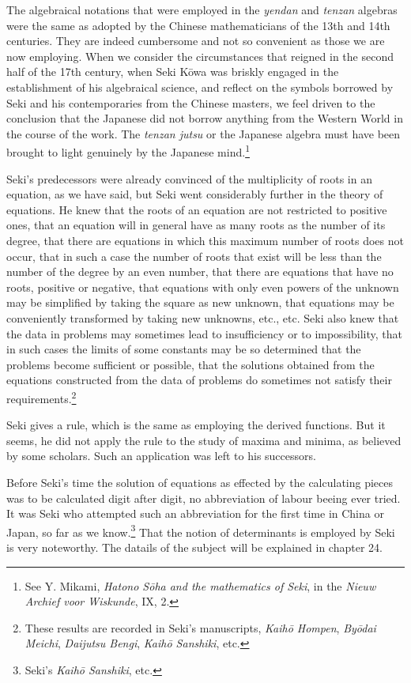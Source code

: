 \documentclass[11pt]{article}
\newcommand{\scanpage}[2]{\clearpage\setcounter{footnote}{0}\noindent{\footnotesize\color{gray}PDF page #1 · #2}\par\medskip}
\newcommand{\scanfooter}{}
\begin{document}
The algebraical notations that were employed in the \emph{yendan} and \emph{tenzan} algebras were the same as adopted by the Chinese mathematicians of the 13th and 14th centuries. They are indeed cumbersome and not so convenient as those we are now employing. When we consider the circumstances that reigned in the second half of the 17th century, when Seki Kōwa was briskly engaged in the establishment of his algebraical science, and reflect on the symbols borrowed by Seki and his contemporaries from the Chinese masters, we feel driven to the conclusion that the Japanese did not borrow anything from the Western World in the course of the work. The \emph{tenzan jutsu} or the Japanese algebra must have been brought to light genuinely by the Japanese mind.\footnote{See Y. Mikami, \emph{Hatono Sōha and the mathematics of Seki}, in the \emph{Nieuw Archief voor Wiskunde}, IX, 2.}

Seki's predecessors were already convinced of the multiplicity of roots in an equation, as we have said, but Seki went considerably further in the theory of equations. He knew that the roots of an equation are not restricted to positive ones, that an equation will in general have as many roots as the number of its degree, that there are equations in which this maximum number of roots does not occur, that in such a case the number of roots that exist will be less than the number of the degree by an even number, that there are equations that have no roots, positive or negative, that equations with only even powers of the unknown may be simplified by taking the square as new unknown, that equations may be conveniently transformed by taking new unknowns, etc., etc. Seki also knew that the data in problems may sometimes lead to insufficiency or to impossibility, that in such cases the limits of some constants may be so determined that the problems become sufficient or possible, that the solutions obtained from the equations constructed from the data of problems do sometimes not satisfy their requirements.\footnote{These results are recorded in Seki's manuscripts, \emph{Kaihō Hompen}, \emph{Byōdai Meichi}, \emph{Daijutsu Bengi}, \emph{Kaihō Sanshiki}, etc.}
\scanfooter

\scanpage{0177}{Chapter 22, printed page 163}
Seki gives a rule, which is the same as employing the derived functions. But it seems, he did not apply the rule to the study of maxima and minima, as believed by some scholars. Such an application was left to his successors.

Before Seki's time the solution of equations as effected by the calculating pieces was to be calculated digit after digit, no abbreviation of labour beeing ever tried. It was Seki who attempted such an abbreviation for the first time in China or Japan, so far as we know.\footnote{Seki's \emph{Kaihō Sanshiki}, etc.} That the notion of determinants is employed by Seki is very noteworthy. The datails of the subject will be explained in chapter 24.
\end{document}
